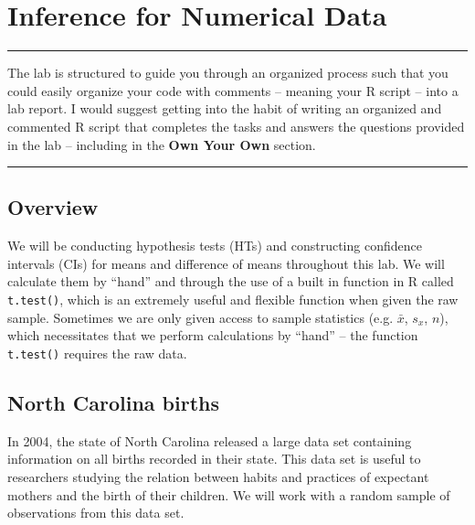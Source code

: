 \documentclass[]{book}
\theoremstyle{definition}
\theoremstyle{definition}
\theoremstyle{definition}
\theoremstyle{remark}
\begin{document}
\hypertarget{inference-for-numerical-data}{%
\chapter{Inference for Numerical
Data}\label{inference-for-numerical-data}}

\begin{center}\rule{0.5\linewidth}{\linethickness}\end{center}

The lab is structured to guide you through an organized process such
that you could easily organize your code with comments -- meaning your R
script -- into a lab report. I would suggest getting into the habit of
writing an organized and commented R script that completes the tasks and
answers the questions provided in the lab -- including in the
\textbf{Own Your Own} section.

\begin{center}\rule{0.5\linewidth}{\linethickness}\end{center}

\hypertarget{overview}{%
\section{Overview}\label{overview}}

We will be conducting hypothesis tests (HTs) and constructing confidence
intervals (CIs) for means and difference of means throughout this lab.
We will calculate them by ``hand'' and through the use of a built in
function in R called \texttt{t.test()}, which is an extremely useful and
flexible function when given the raw sample. Sometimes we are only given
access to sample statistics (e.g. \(\bar{x}\), \(s_x\), \(n\)), which
necessitates that we perform calculations by ``hand'' -- the function
\texttt{t.test()} requires the raw data.

\hypertarget{north-carolina-births}{%
\section{North Carolina births}\label{north-carolina-births}}

In 2004, the state of North Carolina released a large data set
containing information on all births recorded in their state. This data
set is useful to researchers studying the relation between habits and
practices of expectant mothers and the birth of their children. We will
work with a random sample of observations from this data set.
\end{document}

